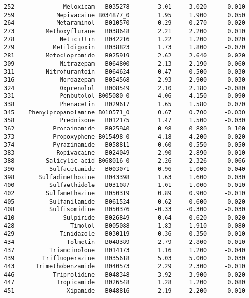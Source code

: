 \begin{verbatim}
252              Meloxicam   B035278        3.01     3.020     -0.010
259            Mepivacaine B034877_0        1.95     1.900      0.050
264            Metaraminol   B010570       -0.29    -0.270     -0.020
273         Methoxyflurane   B038648        2.21     2.200      0.010
278             Meticillin   B042216        1.22     1.200      0.020
279           Metildigoxin   B038823        1.73     1.800     -0.070
281         Metoclopramide   B025919        2.62     2.640     -0.020
309             Nitrazepam   B064800        2.13     2.190     -0.060
311         Nitrofurantoin   B064624       -0.47    -0.500      0.030
316             Nordazepam   B054568        2.93     2.900      0.030
324             Oxprenolol   B008549        2.10     2.180     -0.080
331             Penbutolol B005080_0        4.06     4.150     -0.090
338             Phenacetin   B029617        1.65     1.580      0.070
345    Phenylpropanolamine B010571_0        0.67     0.700     -0.030
358             Prednisone   B012175        1.47     1.500     -0.030
362           Procainamide   B025940        0.98     0.880      0.100
373           Propoxyphene B015498_0        4.18     4.200     -0.020
374           Pyrazinamide   B058811       -0.60    -0.550     -0.050
383            Ropivacaine   B024049        2.90     2.890      0.010
388         Salicylic_acid B068016_0        2.26     2.326     -0.066
396          Sulfacetamide   B003071       -0.96    -1.000      0.040
398       Sulfadimethoxine   B043398        1.63     1.600      0.030
400          Sulfaethidole   B031087        1.01     1.000      0.010
402         Sulfamethazine   B050319        0.89     0.900     -0.010
405          Sulfanilamide   B061524       -0.62    -0.600     -0.020
408          Sulfisomidine   B050376       -0.33    -0.300     -0.030
410              Sulpiride   B026849        0.64     0.620      0.020
428                Timolol   B005088        1.83     1.910     -0.080
429             Tinidazole   B030119       -0.36    -0.350     -0.010
434               Tolmetin   B048389        2.79     2.800     -0.010
437          Triamcinolone   B014173        1.16     1.200     -0.040
439        Trifluoperazine   B035618        5.03     5.000      0.030
443      Trimethobenzamide   B040573        2.29     2.300     -0.010
446           Triprolidine   B048348        3.92     3.900      0.020
447            Tropicamide   B026548        1.28     1.200      0.080
451               Xipamide   B048816        2.19     2.200     -0.010
\end{verbatim}


